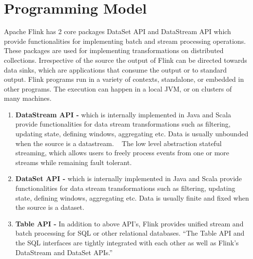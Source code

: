 \section{Programming Model}
Apache Flink has 2 core packages DataSet API and DataStream API which provide functionalities for implementing batch and stream processing operations. These packages are used for implementing  transformations on distributed collections. Irrespective of the source the output of Flink can be directed towards data sinks, which are applications that consume the output or to standard output. Flink programs run in a variety of contexts, standalone, or embedded in other programs. The execution can happen in a local JVM, or on clusters of many machines.~\cite{link8}\\
\begin{enumerate}\item \textbf{DataStream API - } which is internally implemented in Java and Scala provide functionalities for data stream transformations such as filtering, updating state, defining windows, aggregating etc. Data is usually unbounded when the source is a datastream. ~\cite{link6} The low level abstraction stateful streaming, which allows users to freely process events from one or more streams while remaining fault tolerant.~\cite{link4}
\item \textbf{DataSet API - } which is internally implemented in Java and Scala provide functionalities for data stream transformations such as filtering, updating state, defining windows, aggregating etc. Data is usually finite and fixed when the source is a dataset.~\cite{[7]}
\item \textbf{Table API - } In addition to above API's, Flink provides unified stream and batch processing for SQL or other relational databases. ``The Table API and the SQL interfaces are tightly integrated with each other as well as Flink's DataStream and DataSet APIs.''~\cite{link51}\\\end{enumerate}
